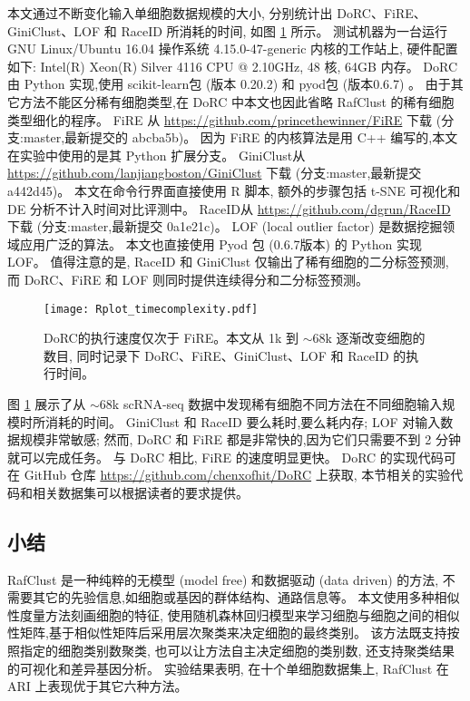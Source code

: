 本文通过不断变化输入单细胞数据规模的大小,
分别统计出 DoRC、FiRE、GiniClust、LOF  和 RaceID 所消耗的时间,
如图 \ref{fig:timecomplexity} 所示。
测试机器为一台运行 GNU Linux/Ubuntu 16.04 操作系统 4.15.0-47-generic 内核的工作站上,
硬件配置如下: Intel(R) Xeon(R) Silver 4116 CPU @ 2.10GHz, 48 核, 64GB 内存。
DoRC 由 Python 实现,使用 scikit-learn包 (版本 0.20.2) 和 pyod包 (版本0.6.7)  。
由于其它方法不能区分稀有细胞类型,在 DoRC 中本文也因此省略 RafClust 的稀有细胞类型细化的程序。
FiRE 从 \url{https://github.com/princethewinner/FiRE} 下载 (分支:master,最新提交的 abcba5b)。
因为 FiRE 的内核算法是用 C++ 编写的,本文在实验中使用的是其 Python 扩展分支。
GiniClust从 \url{https://github.com/lanjiangboston/GiniClust} 下载 (分支:master,最新提交 a442d45)。
本文在命令行界面直接使用 R 脚本,
额外的步骤包括 t-SNE 可视化和 DE 分析不计入时间对比评测中。
RaceID从 \url{https://github.com/dgrun/RaceID} 下载 (分支:master,最新提交 0a1e21c)。
LOF (local outlier factor) 是数据挖掘领域应用广泛的算法。
本文也直接使用 Pyod 包 (0.6.7版本)  的 Python 实现 LOF。
值得注意的是, RaceID 和 GiniClust 仅输出了稀有细胞的二分标签预测,
而 DoRC、FiRE 和 LOF 则同时提供连续得分和二分标签预测。
\begin{figure}[!htbp]
    \centering
    \texttt{[image: Rplot\_timecomplexity.pdf]}
    \caption{
    DoRC的执行速度仅次于 FiRE。本文从 1k 到 ${\sim} 68$k 逐渐改变细胞的数目, 同时记录下 DoRC、FiRE、GiniClust、LOF 和 RaceID 的执行时间。    
    }
    \label{fig:timecomplexity}
\end{figure}
图 \ref{fig:timecomplexity} 展示了从 ${\sim}68$k scRNA-seq 数据中发现稀有细胞不同方法在不同细胞输入规模时所消耗的时间。 
GiniClust 和 RaceID 要么耗时,要么耗内存;
LOF 对输入数据规模非常敏感;
然而, DoRC 和 FiRE 都是非常快的,因为它们只需要不到 2 分钟就可以完成任务。
与 DoRC 相比, FiRE 的速度明显更快。
DoRC 的实现代码可在 GitHub 仓库 \url{https://github.com/chenxofhit/DoRC} 上获取,
本节相关的实验代码和相关数据集可以根据读者的要求提供。

\subsection{小结}

RafClust 是一种纯粹的无模型 (model free) 和数据驱动 (data driven) 的方法,
不需要其它的先验信息,如细胞或基因的群体结构、通路信息等。
本文使用多种相似性度量方法刻画细胞的特征,
使用随机森林回归模型来学习细胞与细胞之间的相似性矩阵,基于相似性矩阵后采用层次聚类来决定细胞的最终类别。
该方法既支持按照指定的细胞类别数聚类, 也可以让方法自主决定细胞的类别数,
还支持聚类结果的可视化和差异基因分析。
实验结果表明, 在十个单细胞数据集上, RafClust 在 ARI 上表现优于其它六种方法。


